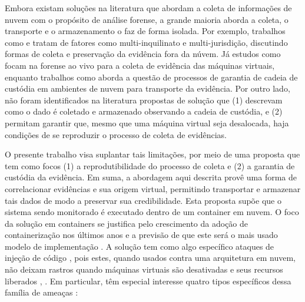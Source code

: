 \documentclass[conference]{IEEEtran}
\newcommand{\marcos}[1]{{\color{blue}{MARCOS: #1}}}
\begin{document}
%
Embora existam soluções na literatura que abordam a coleta de informações de nuvem com o propósito de análise forense, a grande maioria aborda a coleta, o transporte e o armazenamento o faz de forma isolada.
%
Por exemplo, trabalhos como \cite{Dykstra2013} e \cite{Reichert2015} tratam de fatores como multi-inquilinato e multi-jurisdição, discutindo formas de coleta e preservação da evidência fora da núvem.
%
Já estudos como \cite{George2012} focam na forense ao vivo para a coleta de evidência das máquinas virtuais, enquanto trabalhos como \cite{Sang2013} aborda a questão de processos de garantia de cadeia de custódia em ambientes de nuvem para transporte da evidência.
%
%
%
Por outro lado, não foram identificados na literatura propostas de solução que (1) descrevam como o dado é coletado e armazenado observando a cadeia de custódia, e (2) permitam garantir que, mesmo que uma máquina virtual seja desalocada, haja condições de se reproduzir o processo de coleta de evidências.



%
O presente trabalho visa suplantar tais limitações, por meio de uma proposta que tem como focos (1) a reprodutibilidade do processo de coleta e (2) a garantia de custódia da evidência.
%
Em suma, a abordagem aqui descrita provê uma forma de correlacionar evidências e sua origem virtual, permitindo transportar e armazenar tais dados de modo a preservar sua credibilidade.
%
Esta proposta supõe que o sistema sendo monitorado é executado dentro de um container em nuvem. O foco da solução em containers se justifica pelo crescimento da adoção de containerização nos últimos anos e a previsão de que este será o mais usado modelo de implementação \cite{Piraghaj2016}.
A solução tem como algo específico ataques de injeção de código \cite{Case2014}, pois estes, quando usados contra uma arquitetura em nuvem, não deixam rastros quando máquinas virtuais são desativadas e seus recursos liberados \cite{Vomel2013}, \cite{Case2014}.
%
Em particular, têm especial interesse quatro tipos específicos dessa família de ameaças \cite{Case2014}:
\marcos{TODO: talvez seja prematuro listar aqui os tipos de ataques (pode valer a pena mover para seção posterior). Por enquanto, vamos deixar aqui mesmo.- HAMILTON: OK}
\end{document}
